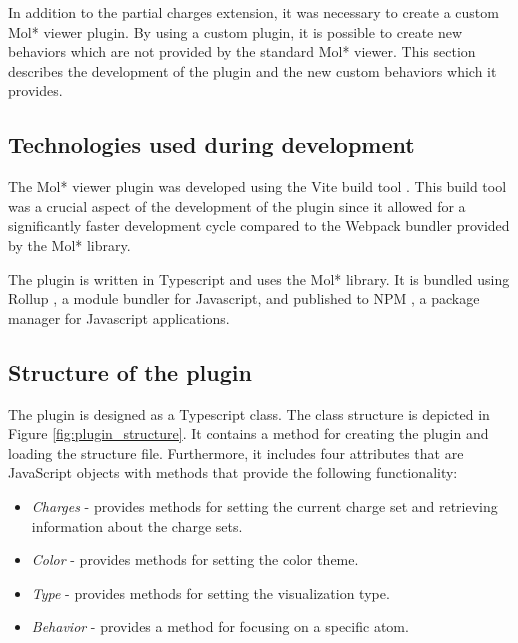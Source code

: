 \documentclass[
  digital,     %
  oneside,     %
  nosansbold,  %
  nocolorbold, %
  lof,         %
  lot,         %
]{fithesis4}
\begin{document}
In addition to the partial charges extension, it was necessary to create a custom Mol* viewer plugin. By using a custom plugin, it is possible to create new behaviors which are not provided by the standard Mol* viewer. This section describes the development of the plugin and the new custom behaviors which it provides.

\subsection{Technologies used during development}

The Mol* viewer plugin was developed using the Vite build tool \cite{vitejs}. This build tool was a crucial aspect of the development of the plugin since it allowed for a significantly faster development cycle compared to the Webpack bundler provided by the Mol* library.

The plugin is written in Typescript and uses the Mol* library. It is bundled using Rollup \cite{rollup}, a module bundler for Javascript, and published to NPM \cite{npm}, a package manager for Javascript applications.

\subsection{Structure of the plugin}

The plugin is designed as a Typescript class. The class structure is depicted in Figure \ref{fig:plugin_structure}. It contains a method for creating the plugin and loading the structure file. Furthermore, it includes four attributes that are JavaScript objects with methods that provide the following functionality:

\begin{itemize}
  \item \textit{Charges} - provides methods for setting the current charge set and retrieving information about the charge sets.
  \item \textit{Color} - provides methods for setting the color theme.
  \item \textit{Type} - provides methods for setting the visualization type.
  \item \textit{Behavior} - provides a method for focusing on a specific atom.
\end{itemize}
\end{document}
